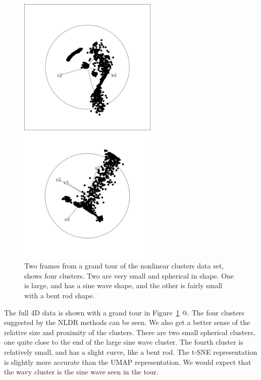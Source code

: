 \documentclass[
  letterpaper,
]{krantz}
\begin{document}
\begin{figure}

\begin{minipage}{0.50\linewidth}
\includegraphics[width=2.60417in,height=\textheight]{images/clusters_nonlin_60.png}\end{minipage}%
%
\begin{minipage}{0.50\linewidth}
\includegraphics[width=2.60417in,height=\textheight]{images/clusters_nonlin_233.png}\end{minipage}%

\caption{\label{fig-clusters-nonlin-pdf}Two frames from a grand tour of
the nonlinear clusters data set, shows four clusters. Two are very small
and spherical in shape. One is large, and has a sine wave shape, and the
other is fairly small with a bent rod shape.}

\end{figure}%

The full 4D data is shown with a grand tour in
Figure~\ref{fig-clusters-nonlin-pdf} @. The four clusters suggested by
the NLDR methods can be seen. We also get a better sense of the relative
size and proximity of the clusters. There are two small spherical
clusters, one quite close to the end of the large sine wave cluster. The
fourth cluster is relatively small, and has a slight curve, like a bent
rod. The t-SNE representation is slightly more accurate than the UMAP
representation. We would expect that the wavy cluster is the sine wave
seen in the tour.
\end{document}

